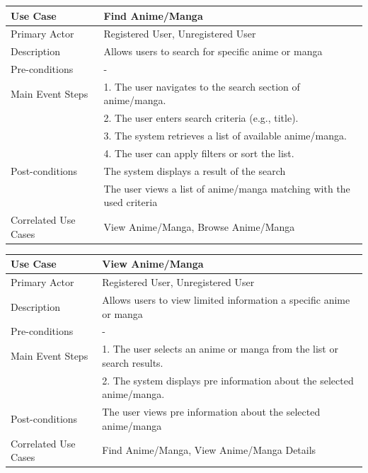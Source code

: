 \begin{longtable}{|p{}|p{}|}
    \hline
    \rowcolor{lightblue}
    \textbf{Use Case} & \textbf{Find Anime/Manga} \\
    \hline
    Primary Actor & Registered User, Unregistered User\\
    \hline
    Description & Allows users to search for specific anime or manga \\
    \hline
    Pre-conditions & - \\
    \hline
    Main Event Steps &  1. The user navigates to the search section of anime/manga. \\
    & 2. The user enters search criteria (e.g., title). \\
    & 3. The system retrieves a list of available anime/manga. \\
    & 4. The user can apply filters or sort the list. \\
    \hline
    Post-conditions & The system displays a result of the search \\
    & The user views a list of anime/manga matching with the used criteria\\
    \hline
    Correlated Use Cases &View Anime/Manga, Browse Anime/Manga \\
    \hline
\end{longtable}

\begin{longtable}{|p{}|p{}|}
    \hline
    \rowcolor{lightblue}
    \textbf{Use Case} & \textbf{View Anime/Manga} \\
    \hline
    Primary Actor & Registered User, Unregistered User\\
    \hline
    Description &Allows users to view limited information a specific anime or manga \\
    \hline
    Pre-conditions & -\\
    \hline
    Main Event Steps & 1. The user selects an anime or manga from the list or search results.\\
    & 2. The system displays pre information about the selected anime/manga. \\
    \hline
    Post-conditions & The user views pre information about the selected anime/manga\\
    \hline
    Correlated Use Cases & Find Anime/Manga, View Anime/Manga Details\\
    \hline
\end{longtable}

